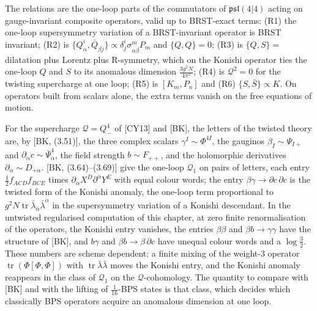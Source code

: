 \begin{remark}
The relations are the one-loop parts of the commutators of $\mathfrak{psl}(4|4)$ acting on gauge-invariant composite operators, valid up to BRST-exact terms: (R1) the one-loop supersymmetry variation of a BRST-invariant operator is BRST invariant; (R2) is $\{Q^i_\alpha,\bar Q_{\dot\beta j}\}\propto\delta^i_j\sigma^m_{\alpha\dot\beta}P_m$ and $\{Q,Q\}=0$; (R3) is $\{Q,S\}=$ dilatation plus Lorentz plus R-symmetry, which on the Konishi operator ties the one-loop $Q$ and $S$ to its anomalous dimension $\frac{3g^2N}{4\pi^2}$; (R4) is $\mathcal Q^2=0$ for the twisting supercharge at one loop; (R5) is $[K_m,P_n]$ and (R6) $\{S,\bar S\}\propto K$. On operators built from scalars alone, the extra terms vanish on the free equations of motion.
\end{remark}

\begin{remark}
For the supercharge $\mathcal Q=Q^4_-$ of [CY13] and [BK], the letters of the twisted theory are, by [BK, (3.51)], the three complex scalars $\gamma^I\sim\Phi^{4I}$, the gauginos $\beta_I\sim\Psi_{I+}$ and $\partial_{\dot\alpha}c\sim\bar\Psi^4_{\dot\alpha}$, the field strength $b\sim F_{++}$, and the holomorphic derivatives $\partial_{\dot\alpha}\sim D_{+\dot\alpha}$. [BK, (3.64)--(3.69)] give the one-loop $\mathcal Q_1$ on pairs of letters, each entry $\tfrac12f_{ACD}f_{BCE}$ times $\partial_{\dot\alpha}X^D\partial^{\dot\alpha}Y^E$ with equal colour words; the entry $\beta\gamma\to\partial c\,\partial c$ is the twisted form of the Konishi anomaly, the one-loop term proportional to $g^2N\operatorname{tr}\bar\lambda_{\dot\alpha}\bar\lambda^{\dot\alpha}$ in the supersymmetry variation of a Konishi descendant. In the untwisted regularised computation of this chapter, at zero finite renormalisation of the operators, the Konishi entry vanishes, the entries $\beta\beta$ and $\beta b\to\gamma\gamma$ have the structure of [BK], and $b\gamma$ and $\beta b\to\beta\,\partial c$ have unequal colour words and a $\log\tfrac32$. These numbers are scheme dependent: a finite mixing of the weight-$3$ operator $\operatorname{tr}(\Phi[\Phi,\Phi])$ with $\operatorname{tr}\bar\lambda\bar\lambda$ moves the Konishi entry, and the Konishi anomaly reappears in the class of $\mathcal Q_1$ on the $\mathcal Q$-cohomology. The quantity to compare with [BK] and with the lifting of $\tfrac1{16}$-BPS states is that class, which decides which classically BPS operators acquire an anomalous dimension at one loop.
\end{remark}

